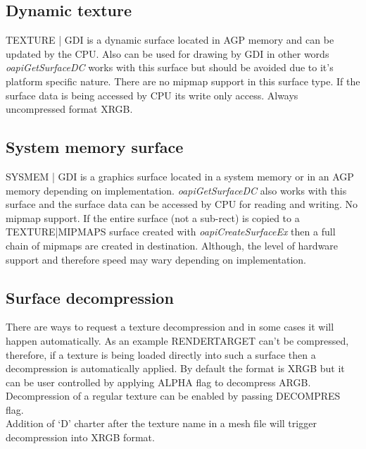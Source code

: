 \documentclass[Orbiter Developer Manual.tex]{subfiles}
\begin{document}
\subsection{Dynamic texture}
\textsc{TEXTURE | GDI} is a dynamic surface located in AGP memory and can be updated by the CPU. Also can be used for drawing by GDI in other words \textit{oapiGetSurfaceDC} works with this surface but should be avoided due to it's platform specific nature. There are no mipmap support in this surface type. If the surface data is being accessed by CPU its write only access. Always uncompressed format XRGB.

\subsection{System memory surface}
\textsc{SYSMEM | GDI} is a graphics surface located in a system memory or in an AGP memory depending on implementation.  \textit{oapiGetSurfaceDC} also works with this surface and the surface data can be accessed by CPU for reading and writing. No mipmap support. If the entire surface (not a sub-rect) is copied to a \textsc{TEXTURE|MIPMAPS} surface created with \textit{oapiCreateSurfaceEx} then a full chain of mipmaps are created in destination. Although, the level of hardware support and therefore speed may wary depending on implementation. 

\subsection{Surface decompression}
There are ways to request a texture decompression and in some cases it will happen automatically. As an example \textsc{RENDERTARGET} can’t be compressed, therefore, if a texture is being loaded directly into such a surface then a decompression is automatically applied. By default the format is XRGB but it can be user controlled by applying \textsc{ALPHA} flag to decompress ARGB. Decompression of a regular texture can be enabled by passing \textsc{DECOMPRES} flag.\\

Addition of ‘D’ charter after the texture name in a mesh file will trigger decompression into XRGB format.
\end{document}
